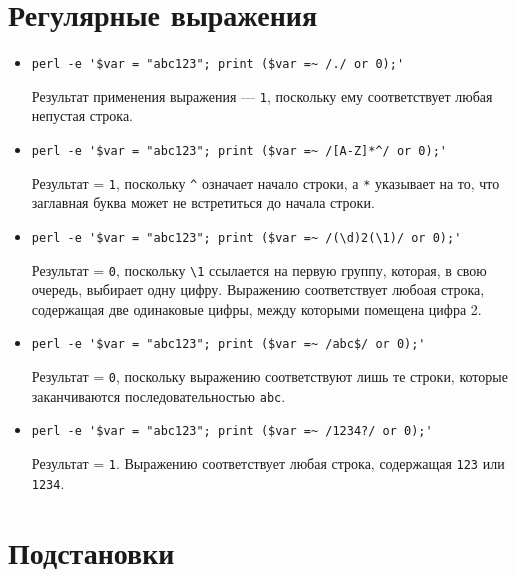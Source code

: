 \documentclass[listings]{labreport}
\begin{document}
\maketitlepage

\section*{Регулярные выражения}

\begin{itemize}
\item \verb|perl -e '$var = "abc123"; print ($var =~ /./ or 0);'|

Результат применения выражения — \texttt{1},
поскольку ему соответствует любая непустая строка.

\item \verb|perl -e '$var = "abc123"; print ($var =~ /[A-Z]*^/ or 0);'|

Результат = \texttt{1}, поскольку \verb|^| означает начало строки, а \verb|*|
указывает на то, что заглавная буква может не встретиться до начала строки.

\item \verb|perl -e '$var = "abc123"; print ($var =~ /(\d)2(\1)/ or 0);'|

Результат = \texttt{0}, поскольку \verb|\1| ссылается на первую группу,
которая, в свою очередь, выбирает одну цифру. Выражению соответствует
любоая строка, содержащая две одинаковые цифры, между которыми помещена цифра 2.

\item \verb|perl -e '$var = "abc123"; print ($var =~ /abc$/ or 0);'|

Результат = \texttt{0}, поскольку выражению соответствуют лишь те строки,
которые заканчиваются последовательностью \texttt{abc}.

\item \verb|perl -e '$var = "abc123"; print ($var =~ /1234?/ or 0);'|

Результат = \texttt{1}. Выражению соответствует любая строка, содержащая
\texttt{123} или \texttt{1234}.
\end{itemize}

\section*{Подстановки}
\end{document}
